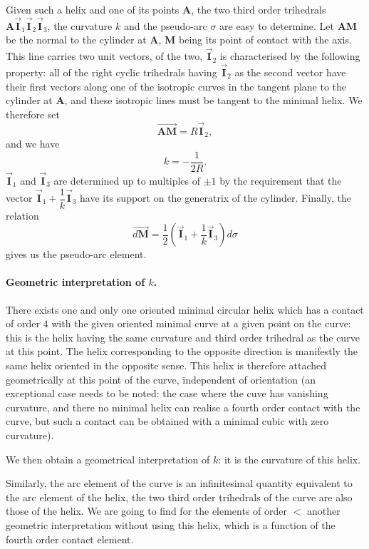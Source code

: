 \documentclass[leqno,11pt]{book}
\numberwithin{equation}{chapter}
\theoremstyle{shape1}
\theoremstyle{shapesmall}
\newcommand{\rvec}[1]{\vec{\mathbf{#1}}}
\newcommand{\ivec}{\rvec{I}}
\begin{document}
Given such a helix and one of its points $\mathbf{A}$, the two third order trihedrals $\mathbf{A}\ivec_{1}\ivec_{2}\ivec_{3}$, the curvature $k$ and the pseudo-arc $\sigma$ are easy to determine. Let $\mathbf{AM}$ be the normal to the cylinder at $\mathbf{A}$, $\mathbf{M}$ being its point of contact with the axis. This line carries two unit vectors, of the two, $\ivec_{2}$ is characterised by the following property: all of the right cyclic trihedrals having $\ivec_{2}$ as the second vector have their first vectors along one of the isotropic curves in the tangent plane to the cylinder at $\mathbf{A}$, and these isotropic lines must be tangent to the minimal helix. We therefore set
\[
\overrightarrow{\mathbf{AM}}=R\ivec_{2},
\]
and we have
\[
k=-\frac{1}{2R}.
\]
$\ivec_{1}$ and $\ivec_{3}$ are determined up to multiples of $\pm 1$ by the requirement that the vector $\ivec_{1}+\dfrac{1}{k}\ivec_{3}$ have its support on the generatrix of the cylinder.
Finally, the relation
\[
\overrightarrow{d\mathbf{M}}=\frac{1}{2}\left(\ivec_{1}+\frac{1}{k}\ivec_{3}\right)d\sigma
\]
gives us the pseudo-arc element.


\paragraph{Geometric interpretation of $k$.}
\label{sec:38}
There exists one and only one oriented minimal circular helix which has a contact of order $4$ with the given oriented minimal curve at a given point on the curve: this is the helix having the same curvature and third order trihedral as the curve at this point. The helix corresponding to the opposite direction is manifestly the same helix oriented in the opposite sense. This helix is therefore attached geometrically at this point of the curve, independent of orientation (an exceptional case needs to be noted: the case where the cuve has vanishing curvature, and there no minimal helix can realise a fourth order contact with the curve, but such a contact can be obtained with a minimal cubic with zero curvature).

We then obtain a geometrical interpretation of $k$: it is the curvature of this helix.

Similarly, the arc element of the curve is an infinitesimal quantity equivalent to the arc element of the helix, the two third order trihedrals of the curve are also those of the helix. We are going to find for the elements of order $<$ another geometric interpretation without using this helix, which is a function of the fourth order contact element.
\end{document}
